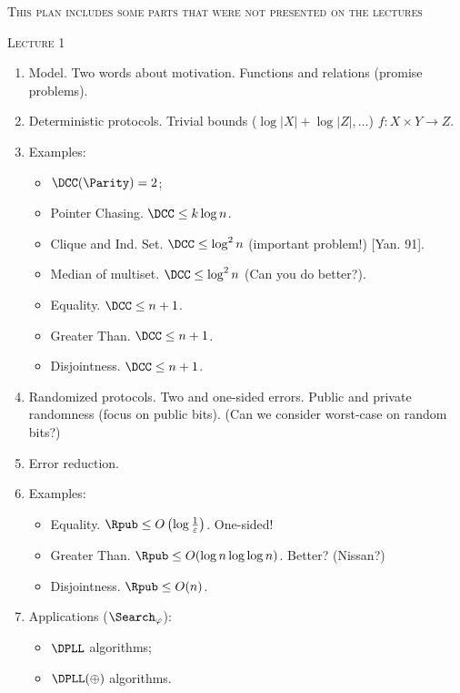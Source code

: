 \centerline{\textsc{This plan includes some parts that were not presented on the lectures}}

\centerline{\textsc{Lecture 1}}

\begin{enumerate}
    \item Model. Two words about motivation. Functions and relations (promise problems).
    \item Deterministic protocols. Trivial bounds ($\log |X| + \log |Z|, \dots$) $f: X \times Y \to Z$.
    \item Examples:
        \begin{itemize}
            \item $\DCC(\Parity) = 2$;
            \item Pointer Chasing. $\DCC \le k \log n$.
            \item Clique and Ind. Set. $\DCC \le \log^2 n$ (important problem!) [Yan. 91].
            \item Median of multiset. $\DCC \le \log^2 n$ (Can you do better?).
            \item Equality. $\DCC \le n + 1$.
            \item Greater Than. $\DCC \le n + 1$.
            \item Disjointness. $\DCC \le n + 1$.                
        \end{itemize}
    \item Randomized protocols. Two and one-sided errors. Public and private randomness (focus on public
        bits). (Can we consider worst-case on random bits?)
    \item Error reduction.
    \item Examples:
        \begin{itemize}
            \item Equality. $\Rpub \le O\left(\log \frac{1}{\varepsilon}\right)$. One-sided!
            \item Greater Than. $\Rpub \le O(\log n \log\log n)$. Better? (Nissan?)
            \item Disjointness. $\Rpub \le O(n)$.      
        \end{itemize}
    \item Applications ($\Search_{\varphi}$):
        \begin{itemize}
            \item $\DPLL$ algorithms;
            \item $\DPLL(\oplus)$ algorithms.
        \end{itemize}
\end{enumerate}



